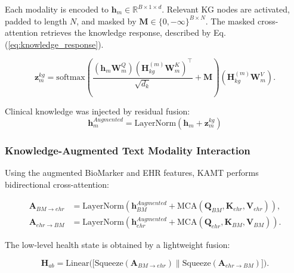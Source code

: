 \documentclass[lettersize,journal]{IEEEtran}
\begin{document}
    Each modality is encoded to $\mathbf{h}_m \in \mathbb{R}^{B \times 1 \times d}$. Relevant KG nodes are activated, padded to length $N$, and masked by $\mathbf{M} \in \{0, -\infty\}^{B\times N}$. The masked cross-attention retrieves the knowledge response, described by Eq.(\ref{eq:knowledge_response}).
    
    \begin{equation}
        \mathbf{z}_{m}^{kg} = \mathrm{softmax}\left( \frac{(\mathbf{h}_m \mathbf{W}_m^Q) (\mathbf{H}_{kg}^{(m)} \mathbf{W}_m^K)^\top}{\sqrt{d_k}} + \mathbf{M} \right) (\mathbf{H}_{kg}^{(m)} \mathbf{W}_m^V).
        \label{eq:knowledge_response}
    \end{equation}

    Clinical knowledge was injected by residual fusion: 
    \begin{equation}
    \mathbf{h}_m^{Augmented} = \mathrm{LayerNorm}(\mathbf{h}_m + \mathbf{z}_{m}^{kg})
    \end{equation}

\subsubsection{Knowledge-Augmented Text Modality Interaction}

    Using the augmented BioMarker and EHR features, KAMT performs bidirectional cross-attention:
    
    \begin{equation}
        \begin{aligned}
        \mathbf{A}_{BM \rightarrow ehr} &= \mathrm{LayerNorm}(\mathbf{h}_{BM}^{Augmented} + \mathrm{MCA}(\mathbf{Q}_{BM}, \mathbf{K}_{ehr}, \mathbf{V}_{ehr})), \\
        \mathbf{A}_{ehr \rightarrow BM} &= \mathrm{LayerNorm}(\mathbf{h}_{ehr}^{Augmented} + \mathrm{MCA}(\mathbf{Q}_{ehr}, \mathbf{K}_{BM}, \mathbf{V}_{BM})).
        \end{aligned}
        \label{eq:bidirectional_mca}
    \end{equation}

    The low-level health state is obtained by a lightweight fusion:
    
    \begin{equation}
        \mathbf{H}_{ab} = \mathrm{Linear}\Big(\big[\mathrm{Squeeze}(\mathbf{A}_{BM \rightarrow ehr}) \parallel \mathrm{Squeeze}(\mathbf{A}_{ehr \rightarrow BM})\big]\Big).
        \label{eq:hab_def}
    \end{equation}
\end{document}
